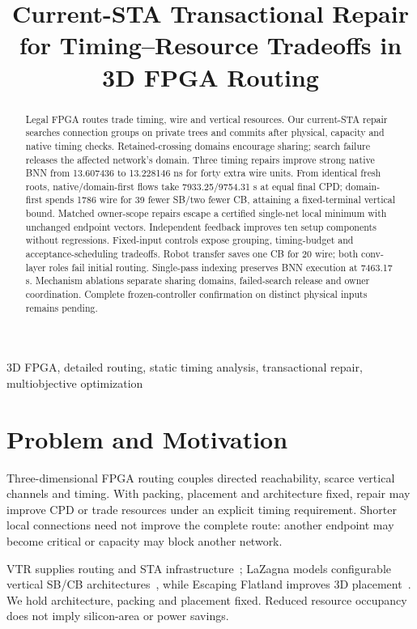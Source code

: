 \documentclass[conference,10pt]{IEEEtran}
\title{Current-STA Transactional Repair for Timing--Resource Tradeoffs in 3D FPGA Routing}
\author{\IEEEauthorblockN{Anonymous development manuscript}}
\begin{document}
\maketitle
\begin{abstract}
Legal FPGA routes trade timing, wire and vertical resources. Our current-STA repair searches connection groups on private trees and commits after physical, capacity and native timing checks. Retained-crossing domains encourage sharing; search failure releases the affected network's domain. Three timing repairs improve strong native BNN from 13.607436 to 13.228146 ns for forty extra wire units. From identical fresh roots, native/domain-first flows take 7933.25/9754.31 s at equal final CPD; domain-first spends 1786 wire for 39 fewer SB/two fewer CB, attaining a fixed-terminal vertical bound. Matched owner-scope repairs escape a certified single-net local minimum with unchanged endpoint vectors. Independent feedback improves ten setup components without regressions. Fixed-input controls expose grouping, timing-budget and acceptance-scheduling tradeoffs. Robot transfer saves one CB for 20 wire; both conv-layer roles fail initial routing. Single-pass indexing preserves BNN execution at 7463.17 s. Mechanism ablations separate sharing domains, failed-search release and owner coordination. Complete frozen-controller confirmation on distinct physical inputs remains pending.
\end{abstract}
\begin{IEEEkeywords}
3D FPGA, detailed routing, static timing analysis, transactional repair, multiobjective optimization
\end{IEEEkeywords}

\section{Problem and Motivation}
Three-dimensional FPGA routing couples directed reachability, scarce vertical channels and timing. With packing, placement and architecture fixed, repair may improve CPD or trade resources under an explicit timing requirement. Shorter local connections need not improve the complete route: another endpoint may become critical or capacity may block another network.

VTR supplies routing and STA infrastructure~\cite{vtr9paper}; LaZagna models configurable vertical SB/CB architectures~\cite{lazagna}, while Escaping Flatland improves 3D placement~\cite{flatland}. We hold architecture, packing and placement fixed. Reduced resource occupancy does not imply silicon-area or power savings.
\end{document}
